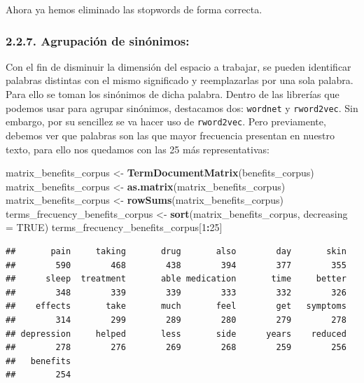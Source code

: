 \documentclass[spanish,]{article}
\newenvironment{Shaded}{\begin{snugshade}}{\end{snugshade}}
\newcommand{\KeywordTok}[1]{\textcolor[rgb]{0.13,0.29,0.53}{\textbf{#1}}}
\newcommand{\DataTypeTok}[1]{\textcolor[rgb]{0.13,0.29,0.53}{#1}}
\newcommand{\DecValTok}[1]{\textcolor[rgb]{0.00,0.00,0.81}{#1}}
\newcommand{\StringTok}[1]{\textcolor[rgb]{0.31,0.60,0.02}{#1}}
\newcommand{\OtherTok}[1]{\textcolor[rgb]{0.56,0.35,0.01}{#1}}
\newcommand{\OperatorTok}[1]{\textcolor[rgb]{0.81,0.36,0.00}{\textbf{#1}}}
\newcommand{\NormalTok}[1]{#1}
\begin{document}
Ahora ya hemos eliminado las stopwords de forma correcta.

\subsubsection{2.2.7. Agrupación de
sinónimos:}\label{agrupacion-de-sinonimos}

Con el fin de disminuir la dimensión del espacio a trabajar, se pueden
identificar palabras distintas con el mismo significado y reemplazarlas
por una sola palabra. Para ello se toman los sinónimos de dicha palabra.
Dentro de las librerías que podemos usar para agrupar sinónimos,
destacamos dos: \texttt{wordnet} y \texttt{rword2vec}. Sin embargo, por
su sencillez se va hacer uso de \texttt{rword2vec}. Pero previamente,
debemos ver que palabras son las que mayor frecuencia presentan en
nuestro texto, para ello nos quedamos con las 25 más representativas:

\begin{Shaded}
\begin{Highlighting}[]
\NormalTok{matrix_benefits_corpus <-}\StringTok{ }\KeywordTok{TermDocumentMatrix}\NormalTok{(benefits_corpus)}
\NormalTok{matrix_benefits_corpus <-}\StringTok{ }\KeywordTok{as.matrix}\NormalTok{(matrix_benefits_corpus)}
\NormalTok{matrix_benefits_corpus <-}\StringTok{ }\KeywordTok{rowSums}\NormalTok{(matrix_benefits_corpus)}
\NormalTok{terms_frecuency_benefits_corpus <-}\StringTok{ }\KeywordTok{sort}\NormalTok{(matrix_benefits_corpus, }\DataTypeTok{decreasing =} \OtherTok{TRUE}\NormalTok{)}
\NormalTok{terms_frecuency_benefits_corpus[}\DecValTok{1}\OperatorTok{:}\DecValTok{25}\NormalTok{]}
\end{Highlighting}
\end{Shaded}

\begin{verbatim}
##       pain     taking       drug       also        day       skin 
##        590        468        438        394        377        355 
##      sleep  treatment       able medication       time     better 
##        348        339        339        333        332        326 
##    effects       take       much       feel        get   symptoms 
##        314        299        289        280        279        278 
## depression     helped       less       side      years    reduced 
##        278        276        269        268        259        256 
##   benefits 
##        254
\end{verbatim}
\end{document}
